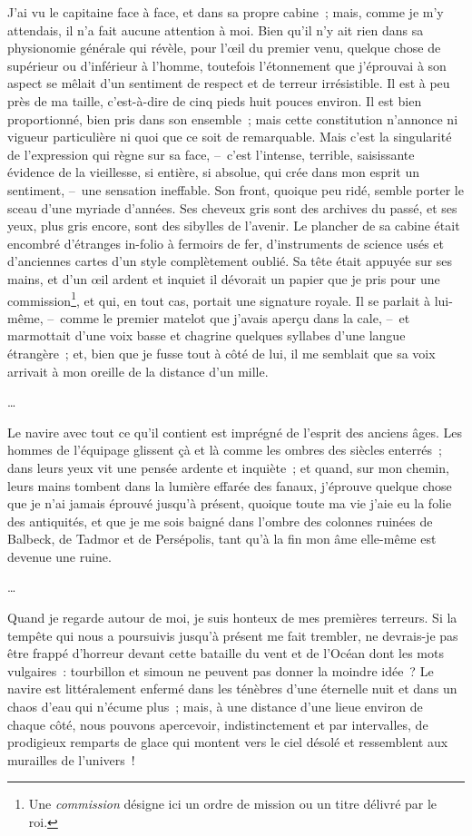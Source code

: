 \documentclass[french,twoside]{book} %
\begin{document}
\noindent J’ai vu le capitaine face à face, et dans sa propre cabine ; mais, comme je m’y attendais, il n’a fait aucune attention à moi. Bien qu’il n’y ait rien dans sa physionomie générale qui révèle, pour l’œil du premier venu, quelque chose de supérieur ou d’inférieur à l’homme, toutefois l’étonnement que j’éprouvai à son aspect se mêlait d’un sentiment de respect et de terreur irrésistible. Il est à peu près de ma taille, c’est-à-dire de cinq pieds huit pouces environ. Il est bien proportionné, bien pris dans son ensemble ; mais cette constitution n’annonce ni vigueur particulière ni quoi que ce soit de remarquable. Mais c’est la singularité de l’expression qui règne sur sa face, – c’est l’intense, terrible, saisissante évidence de la vieillesse, si entière, si absolue, qui crée dans mon esprit un sentiment, – une sensation ineffable. Son front, quoique peu ridé, semble porter le sceau d’une myriade d’années. Ses cheveux gris sont des archives du passé, et ses yeux, plus gris encore, sont des sibylles de l’avenir. Le plancher de sa cabine était encombré d’étranges in-folio à fermoirs de fer, d’instruments de science usés et d’anciennes cartes d’un style complètement oublié. Sa tête était appuyée sur ses mains, et d’un œil ardent et inquiet il dévorait un papier que je pris pour une commission\footnote{Une \emph{commission} désigne ici un ordre de mission ou un titre délivré par le roi.}, et qui, en tout cas, portait une signature royale. Il se parlait à lui-même, – comme le premier matelot que j’avais aperçu dans la cale, – et marmottait d’une voix basse et chagrine quelques syllabes d’une langue étrangère ; et, bien que je fusse tout à côté de lui, il me semblait que sa voix arrivait à mon oreille de la distance d’un mille.\par
…\par
\noindent Le navire avec tout ce qu’il contient est imprégné de l’esprit des anciens âges. Les hommes de l’équipage glissent çà et là comme les ombres des siècles enterrés ; dans leurs yeux vit une pensée ardente et inquiète ; et quand, sur mon chemin, leurs mains tombent dans la lumière effarée des fanaux, j’éprouve quelque chose que je n’ai jamais éprouvé jusqu’à présent, quoique toute ma vie j’aie eu la folie des antiquités, et que je me sois baigné dans l’ombre des colonnes ruinées de Balbeck, de Tadmor et de Persépolis, tant qu’à la fin mon âme elle-même est devenue une ruine.\par
…\par
\noindent Quand je regarde autour de moi, je suis honteux de mes premières terreurs. Si la tempête qui nous a poursuivis jusqu’à présent me fait trembler, ne devrais-je pas être frappé d’horreur devant cette bataille du vent et de l’Océan dont les mots vulgaires : tourbillon et simoun ne peuvent pas donner la moindre idée ? Le navire est littéralement enfermé dans les ténèbres d’une éternelle nuit et dans un chaos d’eau qui n’écume plus ; mais, à une distance d’une lieue environ de chaque côté, nous pouvons apercevoir, indistinctement et par intervalles, de prodigieux remparts de glace qui montent vers le ciel désolé et ressemblent aux murailles de l’univers !\par
\end{document}
